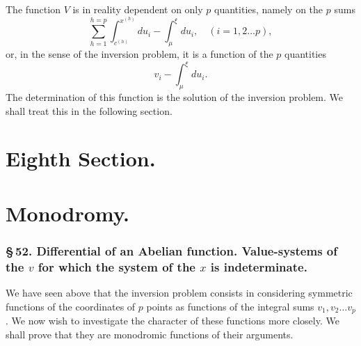 \documentclass[10pt]{article}
\begin{document}
The function \(V\) is in reality dependent on only \(p\) quantities, namely on the \(p\) sums
\[
\sum_{h=1}^{h=p}\int_{c^{(h)}}^{x^{(h)}}du_i-\int_{\mu}^{\xi}du_i,
\quad (i=1,2\ldots p),
\]
or, in the sense of the inversion problem, it is a function of the \(p\) quantities
\[
v_i-\int_{\mu}^{\xi}du_i.
\]
The determination of this function is the solution of the inversion problem. We shall treat this in the following section.

\section*{Eighth Section.}
\section*{Monodromy.}

\subsubsection*{\S\,52. Differential of an Abelian function. Value-systems of the \(v\) for which the system of the \(x\) is indeterminate.}

We have seen above that the inversion problem consists in considering symmetric functions of the coordinates of \(p\) points as functions of the integral sums \(v_1,v_2\ldots v_p\). We now wish to investigate the character of these functions more closely. We shall prove that they are monodromic functions of their arguments.
\end{document}
